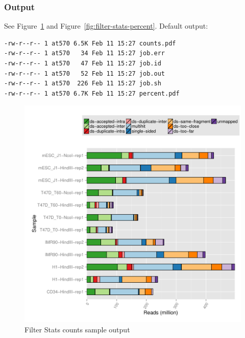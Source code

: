 \subsubsection{Output} %
See Figure~\ref{fig:filter-stats-counts} and Figure~\ref{fig:filter-stats-percent}. Default output: %
\begin{lstlisting}
-rw-r--r-- 1 at570 6.5K Feb 11 15:27 counts.pdf
-rw-r--r-- 1 at570   34 Feb 11 15:27 job.err
-rw-r--r-- 1 at570   47 Feb 11 15:27 job.id
-rw-r--r-- 1 at570   52 Feb 11 15:27 job.out
-rw-r--r-- 1 at570  226 Feb 11 15:27 job.sh
-rw-r--r-- 1 at570 6.7K Feb 11 15:27 percent.pdf
\end{lstlisting}
\begin{figure}[!htb]
    \centering
    \includegraphics[width=\textwidth,height=\textheight,keepaspectratio]{figure/filter-stats_counts}
    \caption{Filter Stats counts sample output} %
    \label{fig:filter-stats-counts}
\end{figure}

